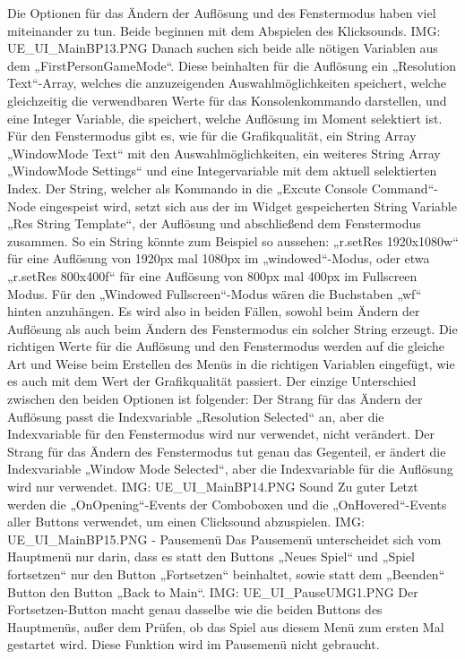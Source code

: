 Die Optionen für das Ändern der Auflösung und des Fenstermodus haben viel miteinander zu tun. Beide beginnen mit dem Abspielen des Klicksounds.
{IMG: UE_UI_MainBP13.PNG}
Danach suchen sich beide alle nötigen Variablen aus dem „FirstPersonGameMode“. Diese beinhalten für die Auflösung ein „Resolution Text“-Array, welches die anzuzeigenden Auswahlmöglichkeiten speichert, welche gleichzeitig die verwendbaren Werte für das Konsolenkommando darstellen, und eine Integer Variable, die speichert, welche Auflösung im Moment selektiert ist. Für den Fenstermodus gibt es, wie für die Grafikqualität, ein String Array „WindowMode Text“ mit den Auswahlmöglichkeiten, ein weiteres String Array „WindowMode Settings“ und eine Integervariable mit dem aktuell selektierten Index.
Der String, welcher als Kommando in die „Excute Console Command“-Node eingespeist wird, setzt sich aus der im Widget gespeicherten String Variable „Res String Template“, der Auflösung und abschließend dem Fenstermodus zusammen. So ein String könnte zum Beispiel so aussehen: „r.setRes 1920x1080w“ für eine Auflösung von 1920px mal 1080px im „windowed“-Modus, oder etwa „r.setRes 800x400f“ für eine Auflösung von 800px mal 400px im Fullscreen Modus. Für den „Windowed Fullscreen“-Modus wären die Buchstaben „wf“ hinten anzuhängen.
Es wird also in beiden Fällen, sowohl beim Ändern der Auflösung als auch beim Ändern des Fenstermodus ein solcher String erzeugt.
Die richtigen Werte für die Auflösung und den Fenstermodus werden auf die gleiche Art und Weise beim Erstellen des Menüs in die richtigen Variablen eingefügt, wie es auch mit dem Wert der Grafikqualität passiert.
Der einzige Unterschied zwischen den beiden Optionen ist folgender: Der Strang für das Ändern der Auflösung passt die Indexvariable „Resolution Selected“ an, aber die Indexvariable für den Fenstermodus wird nur verwendet, nicht verändert. Der Strang für das Ändern des Fenstermodus tut genau das Gegenteil, er ändert die Indexvariable „Window Mode Selected“, aber die Indexvariable für die Auflösung wird nur verwendet.
{IMG: UE_UI_MainBP14.PNG}
Sound
Zu guter Letzt werden die „OnOpening“-Events der Comboboxen und die „OnHovered“-Events aller Buttons verwendet, um einen Clicksound abzuspielen.
{IMG: UE_UI_MainBP15.PNG}
-	Pausemenü
Das Pausemenü unterscheidet sich vom Hauptmenü nur darin, dass es statt den Buttons „Neues Spiel“ und „Spiel fortsetzen“ nur den Button „Fortsetzen“ beinhaltet, sowie statt dem „Beenden“ Button den Button „Back to Main“.
{IMG: UE_UI_PauseUMG1.PNG}
Der Fortsetzen-Button macht genau dasselbe wie die beiden Buttons des Hauptmenüs, außer dem Prüfen, ob das Spiel aus diesem Menü zum ersten Mal gestartet wird. Diese Funktion wird im Pausemenü nicht gebraucht.
